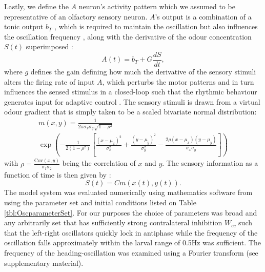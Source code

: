 \documentclass[11pt,a4paper]{article}
\newcommand{\Cov}{\mathrm{Cov}}
\newcommand{\todoKL}[1]{\todo[author=KL,color=blue!40, size=\tiny,inline]{#1}}
\begin{document}
Lastly, we define the $A$ neuron's activity pattern which we assumed to be representative of an olfactory sensory neuron. $A$'s output is a combination of a tonic output $b_T$ , which is required to maintain the oscillation but also influences the oscillation frequency \cite{lansner1997realistic}, along with the derivative of the odour concentration $S(t)$ superimposed : 
\begin{equation}
A(t) = b_T + G \frac{dS}{dt},
\end{equation}
where $g$ defines the gain defining how much the derivative of the sensory stimuli alters the firing  rate of input $A$, which perturbs the motor patterns and in turn influences the sensed stimulus in a closed-loop such that the rhythmic behaviour generates input for adaptive control \cite[see][]{willis1997centrally}.
The sensory stimuli is drawn from a virtual odour gradient that is simply taken to be a scaled bivariate normal distribution:
\begin{multline}
m(x,y) = \frac{1}{2 \pi  \sigma_x \sigma_y \sqrt{1-\rho^2}}\\
      \exp\left(
        -\frac{1}{2(1-\rho^2)}
        \left[
          \frac{(x-\mu_x)^2}{\sigma_x^2} + 
          \frac{(y-\mu_y)^2}{\sigma_y^2} -
          \frac{2\rho(x-\mu_x)(y-\mu_y)}{\sigma_x \sigma_y} \right]\right)
\label{eqn:bivariateNormal}
\end{multline}
with $\rho = \frac{\Cov(x,y)}{\sigma_1 \sigma_2}$ being the correlation of $x$ and $y$.
The sensory information as a function of time is then given by :
\begin{equation}
S(t) = C m(x(t),y(t)).
\label{eq:SensoryFunction}
\end{equation}
The model system was evaluated numerically using mathematics software from \cite{math}
using the parameter set and initial conditions listed on Table \ref{tbl:OscparameterSet}.
 For our purposes the choice of parameters was broad and any arbitrarily set that has sufficiently strong contralateral inhibition $W_{cc}$ such that the left-right oscillators quickly lock in antiphase while the frequency of the oscillation falls approximately within the larval range of 0.5Hz was sufficient. The frequency of the heading-oscillation was examined using a Fourier transform (see supplementary material).
\end{document}
